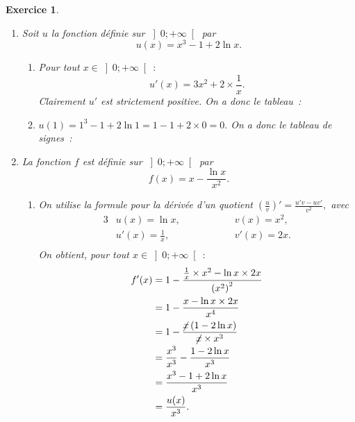 \documentclass[10pt]{article}
\newtheorem{exo}{Exercice}
\begin{document}
\begin{exo}

\begin{enumerate}

\item Soit $u$ la fonction définie sur $\left]0;+\infty\right[$ par
\[u(x)=x^3-1+2\ln x.\]
\begin{enumerate}
\item Pour tout $x\in \left]0;+\infty\right[~:$
\[u'(x)=3x^2+2\times\frac{1}{x}.\] Clairement $u'$ est strictement positive. On a donc le tableau~:

\medskip
\begin{center}
\end{center}

\medskip

\item $u(1)=1^3-1+2\ln 1=1-1+2\times 0=0.$ On a donc le tableau de signes~:

\medskip
\begin{center}
\end{center}

\medskip

\end{enumerate}
\item La fonction $f$ est définie sur $\left]0;+\infty\right[$ par \[f(x)=x-\frac{\ln x}{x^2}.\]
\begin{enumerate}
\item On utilise la formule pour la dérivée d'un quotient $\left(\frac{u}{v}\right)'=\frac{u'v-uv'}{v^2},$ avec
\begin{alignat*}{3}
&u(x)=\ln x,&& \hspace{1cm}&&v(x)=x^2, \\
& u'(x)=\frac{1}{x},&& &&v'(x)=2x.\\
\end{alignat*}
On obtient, pour tout $x\in \left]0;+\infty\right[~:$
\begin{align*}
f'(x)&=1-\frac{\frac{1}{x}\times x^2-\ln x\times 2x}{\left(x^2\right)^2}\\
&=1-\frac{x-\ln x\times 2x}{x^4}\\
&=1-\frac{\cancel{x}\left(1-2\ln x\right)}{\cancel{x}\times x^3}\\
&=\frac{x^3}{x^3}-\frac{1-2\ln x}{x^3}\\
&=\frac{x^3-1+2\ln x}{x^3}\\
&=\frac{u(x)}{x^3}.\end{align*}



\end{enumerate}
\end{enumerate}
\end{exo}
\end{document}
